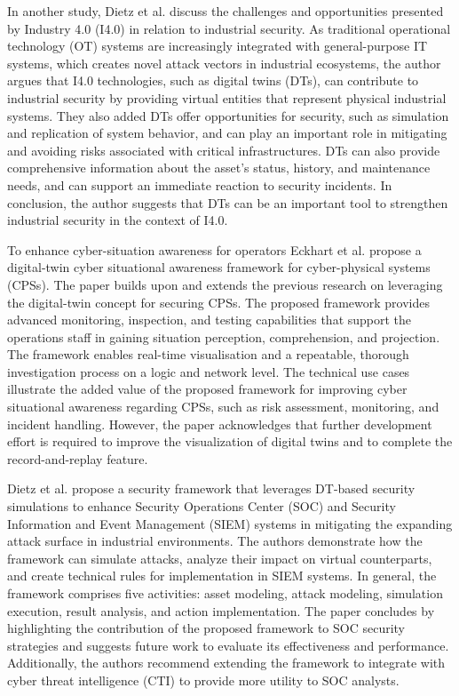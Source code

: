 In another study, Dietz et al.\cite{dietzUnleashingDigitalTwin2020} discuss the challenges and opportunities presented by Industry 4.0 (I4.0) in relation to industrial security. As traditional operational technology (OT) systems are increasingly integrated with general-purpose IT systems, which creates novel attack vectors in industrial ecosystems, the author argues that I4.0 technologies, such as digital twins (DTs), can contribute to industrial security by providing virtual entities that represent physical industrial systems. They also added DTs offer opportunities for security, such as simulation and replication of system behavior, and can play an important role in mitigating and avoiding risks associated with critical infrastructures. DTs can also provide comprehensive information about the asset's status, history, and maintenance needs, and can support an immediate reaction to security incidents. In conclusion, the author suggests that DTs can be an important tool to strengthen industrial security in the context of I4.0.


To enhance cyber-situation awareness for operators Eckhart et al.\cite{eckhartEnhancingCyberSituational2019} propose a digital-twin cyber situational awareness framework for cyber-physical systems (CPSs). The paper builds upon and extends the previous research on leveraging the digital-twin concept for securing CPSs. The proposed framework provides advanced monitoring, inspection, and testing capabilities that support the operations staff in gaining situation perception, comprehension, and projection. The framework enables real-time visualisation and a repeatable, thorough investigation process on a logic and network level. The technical use cases illustrate the added value of the proposed framework for improving cyber situational awareness regarding CPSs, such as risk assessment, monitoring, and incident handling. However, the paper acknowledges that further development effort is required to improve the visualization of digital twins and to complete the record-and-replay feature. 


Dietz et al.\cite{dietzIntegratingDigitalTwin2020} propose a security framework that leverages DT-based security simulations to enhance Security Operations Center (SOC) and Security Information and Event Management (SIEM) systems in mitigating the expanding attack surface in industrial environments. The authors demonstrate how the framework can simulate attacks, analyze their impact on virtual counterparts, and create technical rules for implementation in SIEM systems. In general, the framework comprises five activities: asset modeling, attack modeling, simulation execution, result analysis, and action implementation. The paper concludes by highlighting the contribution of the proposed framework  to SOC security strategies and suggests future work to evaluate its effectiveness and performance. Additionally, the authors recommend extending the framework to integrate with cyber threat intelligence (CTI) to provide more utility to SOC analysts.

